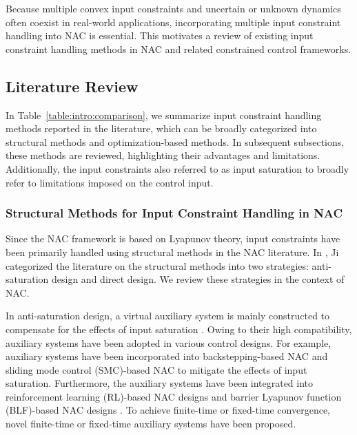 \documentclass[letterpaper, journal]{IEEEtran}
\begin{document}
Because multiple convex input constraints and uncertain or unknown dynamics often coexist in real-world applications, incorporating multiple input constraint handling into NAC is essential.
This motivates a review of existing input constraint handling methods in NAC and related constrained control frameworks.

\subsection{Literature Review}


In Table~\ref{table:intro:comparison}, we summarize input constraint handling methods reported in the literature, which can be broadly categorized into structural methods and optimization-based methods.
In subsequent subsections, these methods are reviewed, highlighting their advantages and limitations.
Additionally, the input constraints also referred to as input saturation to broadly refer to limitations imposed on the control input.

\subsubsection{Structural Methods for Input Constraint Handling in NAC}

Since the NAC framework is based on Lyapunov theory, input constraints have been primarily handled using structural methods in the NAC literature.
In \cite{Ji:2025aa}, Ji \etal categorized the literature on the structural methods into two strategies: anti-saturation design and direct design.
We review these strategies in the context of NAC.

In anti-saturation design, a virtual auxiliary system is mainly constructed to compensate for the effects of input saturation \cite{Ma:2025aa,Gao:2026aa,Yang:2021aa,Jia:2020aa,Liu:2024aa,Liu:2025aa,Gao:2017aa,Esfandiari:2014aa,Esfandiari:2015aa,Yu:2022aa,Rezaei:2025aa,He:2016aa,He:2019aa,Zhao:2016aa,Peng:2020aa}.
Owing to their high compatibility, auxiliary systems have been adopted in various control designs.
For example, auxiliary systems have been incorporated into backstepping-based NAC \cite{Gao:2017aa} and sliding mode control (SMC)-based NAC \cite{Ma:2025aa} to mitigate the effects of input saturation.
Furthermore, the auxiliary systems have been integrated into reinforcement learning (RL)-based NAC designs \cite{Gao:2026aa} and barrier Lyapunov function (BLF)-based NAC designs \cite{Yang:2021aa}.
To achieve finite-time or fixed-time convergence, novel finite-time \cite{Jia:2020aa} or fixed-time \cite{Liu:2024aa,Liu:2025aa} auxiliary systems have been proposed.
\end{document}
